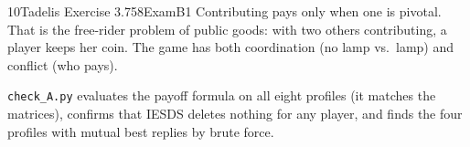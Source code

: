 \begin{exsol}{10}{Tadelis Exercise 3.7}{58}{Exam}{B1}
\interp Contributing pays only when one is pivotal. That is the free-rider problem of public
goods: with two others contributing, a player keeps her coin. The game has both
coordination (no lamp vs.\ lamp) and conflict (who pays).

\verify \texttt{check\_A.py} evaluates the payoff formula on all eight profiles (it matches the
matrices), confirms that IESDS deletes nothing for any player, and finds the four profiles with
mutual best replies by brute force.

\end{exsol}
